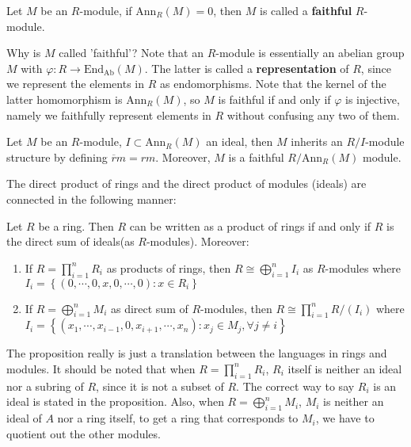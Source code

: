 \documentclass{note-eng}
\begin{document}
\begin{definition}[Faithful]
    Let $M$ be an $R$-module, if $\mathrm{Ann}_R(M) = 0$, then $M$ is called a \textbf{faithful} $R$-module.
\end{definition}

Why is $M$ called 'faithful'? Note that an $R$-module is essentially an abelian group $M$ with $\varphi: R \rightarrow \mathrm{End}_{\mathrm{Ab}}(M)$. The latter is called a \textbf{representation} of $R$, since we represent the elements in $R$ as endomorphisms. Note that the kernel of the latter homomorphism is $\mathrm{Ann}_R(M)$, so $M$ is faithful if and only if $\varphi$ is injective, namely we faithfully represent elements in $R$ without confusing any two of them.

\begin{proposition}
    Let $M$ be an $R$-module, $I \subset \mathrm{Ann}_R(M)$ an ideal, then $M$ inherits an $R / I$-module structure by defining $\overline{r} m = rm$. Moreover, $M$ is a faithful $R / \mathrm{Ann}_R(M)$ module.
\end{proposition}

The direct product of rings and the direct product of modules (ideals) are connected in the following manner:

\begin{proposition}
    Let $R$ be a ring. Then $R$ can be written as a product of rings if and only if $R$ is the direct sum of ideals(as $R$-modules). Moreover:
    \begin{enumerate}
        \item If $R = \prod\limits_{i = 1}^{n} R_i$ as products of rings, then $R \cong \bigoplus\limits_{i = 1}^n I_i$ as $R$-modules where $I_i = \left\lbrace (0, \cdots, 0, x, 0, \cdots, 0): x \in R_i \right\rbrace$
        \item If $R = \bigoplus\limits_{i = 1}^{n} M_i$ as direct sum of $R$-modules, then $R \cong \prod\limits_{i = 1}^{n} R / (I_i)$ where $I_i = \left\lbrace (x_1, \cdots, x_{i - 1}, 0, x_{i + 1}, \cdots, x_n): x_j \in M_j, \forall j \ne i \right\rbrace$
    \end{enumerate}
\end{proposition}

The proposition really is just a translation between the languages in rings and modules. It should be noted that when $R = \prod\limits_{i = 1}^{n} R_i$, $R_i$ itself is neither an ideal nor a subring of $R$, since it is not a subset of $R$. The correct way to say $R_i$ is an ideal is stated in the proposition. Also, when $R = \bigoplus\limits_{i = 1}^nM_i$, $M_i$ is neither an ideal of $A$ nor a ring itself, to get a ring that corresponds to $M_i$, we have to quotient out the other modules.
\end{document}
